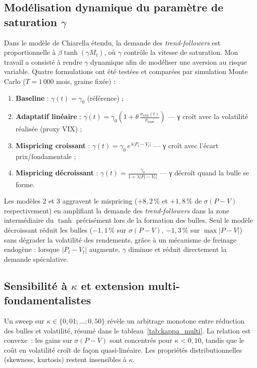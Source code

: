 \subsection*{Modélisation dynamique du paramètre de saturation $\gamma$}

Dans le modèle de Chiarella étendu, la demande des \textit{trend-followers} est
proportionnelle à $\beta\tanh(\gamma M_t)$, où $\gamma$ contrôle la vitesse de
saturation. Mon travail a consisté à rendre $\gamma$ dynamique afin de modéliser
une aversion au risque variable. Quatre formulations ont été testées et comparées
par simulation Monte Carlo ($T = 1\,000$ mois, graine fixée) :

\begin{enumerate}
  \item \textbf{Baseline} : $\gamma(t) = \gamma_0$ (référence) ;
  \item \textbf{Adaptatif linéaire} : $\gamma(t) = \gamma_0\!\left(1 +
        \theta\,\tfrac{\sigma_{\mathrm{réal}}(t)}{\sigma_{\mathrm{base}}}\right)$
        — γ croît avec la volatilité réalisée (proxy VIX) ;
  \item \textbf{Mispricing croissant} : $\gamma(t) = \gamma_0\,e^{\lambda|P_t - V_t|}$
        — γ croît avec l'écart prix/fondamentale ;
  \item \textbf{Mispricing décroissant} : $\gamma(t) = \tfrac{\gamma_0}{1 + \lambda|P_t - V_t|}$
        — γ décroît quand la bulle se forme.
\end{enumerate}

Les modèles 2 et 3 aggravent le mispricing ($+8{,}2\,\%$ et $+1{,}8\,\%$ de
$\sigma(P-V)$ respectivement) en amplifiant la demande des \textit{trend-followers}
dans la zone intermédiaire du $\tanh$ précisément lors de la formation des bulles.
Seul le modèle décroissant réduit les bulles ($-1{,}1\,\%$ sur $\sigma(P-V)$,
$-1{,}3\,\%$ sur $\max|P-V|$) sans dégrader la volatilité des rendements, grâce
à un mécanisme de freinage endogène : lorsque $|P_t - V_t|$ augmente, $\gamma$
diminue et réduit directement la demande spéculative.

\subsection*{Sensibilité à $\kappa$ et extension multi-fondamentalistes}

Un sweep sur $\kappa \in \{0{,}01;\ldots;0{,}50\}$ révèle un arbitrage monotone
entre réduction des bulles et volatilité, résumé dans le tableau~\ref{tab:kappa_multi}.
La relation est convexe~: les gains sur $\sigma(P-V)$ sont concentrés pour
$\kappa < 0{,}10$, tandis que le coût en volatilité croît de façon quasi-linéaire.
Les propriétés distributionnelles (skewness, kurtosis) restent insensibles à $\kappa$.

